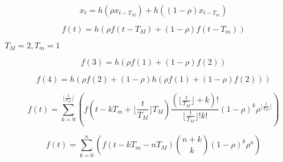 \documentclass{article}
\begin{document}
\newcommand\f{0.15}

\begin{equation}
	x_t = h(\rho x_{t-T_M}) + h((1 - \rho) x_{t-T_m})
\end{equation}

\begin{equation}
	f(t) = h(\rho f(t-T_M) + (1 - \rho) f(t-T_m))
\end{equation}

\begin{math}
	T_M = 2, T_m = 1
\end{math}

\begin{equation}
	f(3) = h(\rho f(1) + (1 - \rho) f(2))
\end{equation}

\begin{equation}
	f(4) = h(\rho f(2) + (1 - \rho) h(\rho f(1) + (1 - \rho) f(2)))
\end{equation}

\begin{equation}
	f(t) = \sum_{k=0}^{\lfloor \frac{t}{T_m} \rfloor}\left(f(t - kT_m + \lfloor \frac{t}{T_M} \rfloor T_M)\frac{(\lfloor \frac{t}{T_M} \rfloor + k)!}{ \lfloor \frac{t}{T_M} \rfloor ! k!}(1 - \rho)^{k} \rho^{\lfloor \frac{t}{T_M} \rfloor}\right)
\end{equation}

\begin{equation}
	f(t) = \sum_{k=0}^{n}\left(f(t - kT_m - nT_M)\binom{n+k}{k} (1 - \rho)^{k} \rho^n\right)
\end{equation}

\vspace{2cm}
\end{document}
